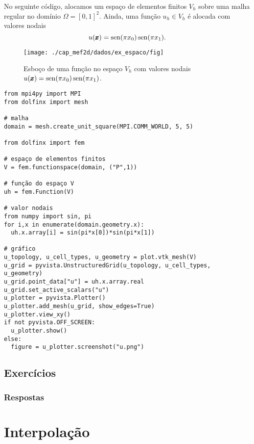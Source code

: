 \begin{ex}\label{cap_mef2d_sec_malha:ex:espaço}
No seguinte código, alocamos um espaço de elementos finitos $V_h$ sobre uma malha regular no domínio $\Omega=[0,1]^2$. Ainda, uma função $u_h\in V_h$ é alocada com valores nodais
\begin{equation}
  u(\pmb{x}) = \operatorname{sen}(\pi x_0)\operatorname{sen}(\pi x_1).
\end{equation}

\begin{figure}
  \centering
  \texttt{[image: ./cap\_mef2d/dados/ex\_espaco/fig]}
  \caption{Esboço de uma função no espaço $V_h$ com valores nodais $u(\pmb{x}) = \operatorname{sen}(\pi x_0)\operatorname{sen}(\pi x_1)$.}
\end{figure}

\begin{lstlisting}
from mpi4py import MPI
from dolfinx import mesh

# malha
domain = mesh.create_unit_square(MPI.COMM_WORLD, 5, 5)

from dolfinx import fem

# espaço de elementos finitos
V = fem.functionspace(domain, ("P",1))

# função do espaço V
uh = fem.Function(V)

# valor nodais
from numpy import sin, pi
for i,x in enumerate(domain.geometry.x):
  uh.x.array[i] = sin(pi*x[0])*sin(pi*x[1])

# gráfico
u_topology, u_cell_types, u_geometry = plot.vtk_mesh(V)
u_grid = pyvista.UnstructuredGrid(u_topology, u_cell_types, u_geometry)
u_grid.point_data["u"] = uh.x.array.real
u_grid.set_active_scalars("u")
u_plotter = pyvista.Plotter()
u_plotter.add_mesh(u_grid, show_edges=True)
u_plotter.view_xy()
if not pyvista.OFF_SCREEN:
  u_plotter.show()
else:
  figure = u_plotter.screenshot("u.png")
\end{lstlisting}
\end{ex}

\subsection{Exercícios}
\badgeConstrucao

\ifisbook
\subsubsection{Respostas}
\shipoutAnswer
\fi

\section{Interpolação}\label{cap_mef2d_sec_interp}
\badgeRevisar

